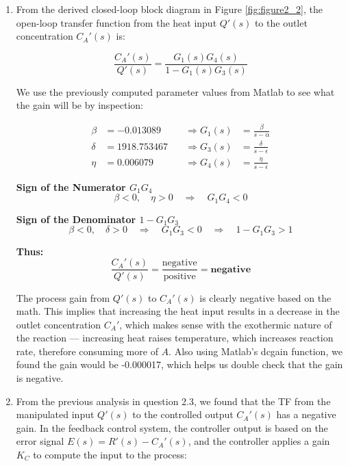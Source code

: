 \documentclass[12pt]{article}
\begin{document}
\begin{enumerate}
\begin{enumerate}
    \clearpage
    \item From the derived closed-loop block diagram in Figure \ref{fig:figure2_2}, the open-loop transfer function from the heat input \(Q'(s)\) to the outlet concentration \(C_A'(s)\) is:

    \[
    \frac{C_A'(s)}{Q'(s)} = \frac{G_1(s) G_4(s)}{1 - G_1(s) G_3(s)}
    \]
    
    We use the previously computed parameter values from Matlab to see what the gain will be by inspection:
    
    \[
    \begin{aligned}
    \beta &= -0.013089 \quad &\Rightarrow G_1(s) &= \frac{\beta}{s - \alpha} \\
    \delta &= 1918.753467 \quad &\Rightarrow G_3(s) &= \frac{\delta}{s - \epsilon} \\
    \eta &= 0.006079 \quad &\Rightarrow G_4(s) &= \frac{\eta}{s - \epsilon}
    \end{aligned}
    \]
    
    \medskip
    
    \noindent\textbf{Sign of the Numerator \(G_1 G_4\)}  
    \[
    \beta < 0, \quad \eta > 0 \quad \Rightarrow \quad G_1 G_4 < 0
    \]
    
    \noindent\textbf{Sign of the Denominator \(1 - G_1 G_3\)}  
    \[
    \beta < 0, \quad \delta > 0 \quad \Rightarrow \quad G_1 G_3 < 0 \quad \Rightarrow \quad 1 - G_1 G_3 > 1
    \]
    
    \noindent\textbf{Thus:}
    \[
    \frac{C_A'(s)}{Q'(s)} = \frac{\text{negative}}{\text{positive}} = \textbf{negative}
    \]
    
    \medskip
    
    \noindent The process gain from \(Q'(s)\) to \(C_A'(s)\) is clearly negative based on the math. This implies that increasing the heat input results in a decrease in the outlet concentration \(C_A'\), which makes sense with the exothermic nature of the reaction — increasing heat raises temperature, which increases reaction rate, therefore consuming more of \(A\). Also using Matlab's dcgain function, we found the gain would be -0.000017, which helps us double check that the gain is negative.

    \item From the previous analysis in question 2.3, we found that the TF from the manipulated input \(Q'(s)\) to the controlled output \(C_A'(s)\) has a negative gain. In the feedback control system, the controller output is based on the error signal \(E(s) = R'(s) - C_A'(s)\), and the controller applies a gain \(K_C\) to compute the input to the process:
    

\end{enumerate}
\end{enumerate}
\end{document}
